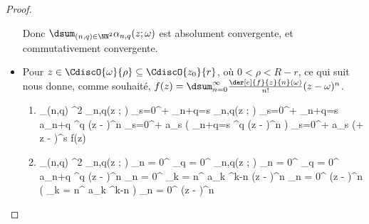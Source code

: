 \begin{proof}
\begin{itemize}
		\noindent
		Donc
		$\dsum_{(n,q) \in \NN^2} \alpha_{n,q}(z ; \omega)$
		est absolument convergente,
		et commutativement convergente.
	

		\item Pour $z \in \CdiscO{\omega}{\rho} \subseteq \CdiscO{z_0}{r}$, où $0 < \rho < R - r$, ce qui suit nous donne, comme souhaité,
		$f(z) = \dsum_{n = 0}^{\infty} \frac{\der[e]{f}{z}{n}(\omega)}{n!} (z - \omega)^n$.

        \begin{multicols}{2}
        	\begin{enumerate}[wide]
    			\item
        		\begin{stepcalc}[style=ar*]
        			\dsum_{(n,q) \in \NN^2} \alpha_{n,q}(z ; \omega)
        		\explnext{}
        			\dsum_{s=0}^{+\infty} \dsum_{n+q=s} \alpha_{n,q}(z ; \omega)
        		\explnext{}
        			\dsum_{s=0}^{+\infty} \dsum_{n+q=s}  a_{n+q} \omega^q (z - \omega)^n
        		\explnext{}
        			\dsum_{s=0}^{+\infty} a_s \big( \dsum_{n+q=s}  \omega^q (z - \omega)^n \big)
        		\explnext{}
        			\dsum_{s=0}^{+\infty} a_s (\omega + z - \omega)^s
        		\explnext{}
        			f(z)
        		\end{stepcalc}


    			\item
        		\begin{stepcalc}[style=ar*]
        			\dsum_{(n,q) \in \NN^2} \alpha_{n,q}(z ; \omega)
        		\explnext{}
        			\dsum_{n = 0}^{\infty} \dsum_{q = 0}^{\infty} \alpha_{n,q}(z ; \omega)
        		\explnext{}
        			\dsum_{n = 0}^{\infty} \dsum_{q = 0}^{\infty}  a_{n+q} \omega^q (z - \omega)^n
        		\explnext{}
        			\dsum_{n = 0}^{\infty} \dsum_{k = n}^{\infty}  a_{k} \omega^{k-n} (z - \omega)^n
        		\explnext{}
        			\dsum_{n = 0}^{\infty}  (z - \omega)^n \big( \dsum_{k = n}^{\infty}  a_{k} \omega^{k-n} \big) 
        		\explnext{}
        			\dsum_{n = 0}^{\infty}  (z - \omega)^n
        		\end{stepcalc}
    		\end{enumerate}
	\end{multicols}
	\end{itemize}

	\null\vspace{-8ex}
\end{proof}


